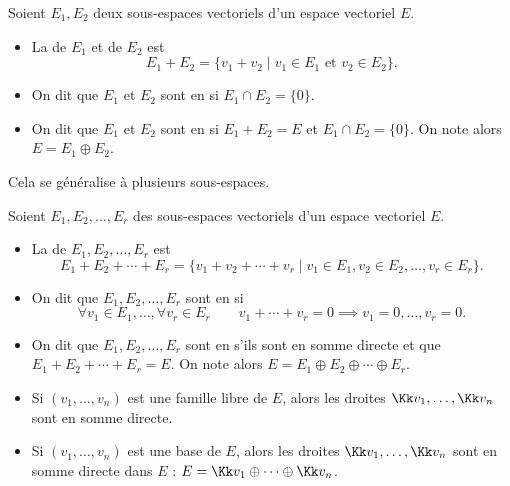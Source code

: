 \documentclass[12pt, class=report,crop=false]{standalone}
\begin{document}
\begin{definition}
Soient $E_1,E_2$ deux sous-espaces vectoriels d'un espace vectoriel $E$.
\begin{itemize}
  \item La  de $E_1$ et de $E_2$ est
  $$E_1+E_2 = \big\{  v_1 + v_2 \mid v_1 \in E_1 \text{ et } v_2 \in E_2 \big\}.$$
  
 
  \item On dit que $E_1$ et $E_2$ sont en  si $E_1 \cap E_2 = \{0\}$.
   

  \item On dit que $E_1$ et $E_2$ sont en  si 
  $E_1 + E_2 = E$ et $E_1 \cap E_2 = \{0\}$. On note alors
  $E = E_1 \oplus E_2$.
  
\end{itemize}
\end{definition}

Cela se généralise à plusieurs sous-espaces.
\begin{definition}
Soient $E_1,E_2, \ldots,E_r$ des sous-espaces vectoriels d'un espace vectoriel $E$.
\begin{itemize}
  \item La  de $E_1,E_2, \ldots,E_r$ est
  $$E_1+E_2+\cdots + E_r = \big\{  v_1 + v_2 + \cdots + v_r \mid v_1 \in E_1, v_2 \in E_2,\ldots,v_r \in E_r \big\}.$$  
 
 
  \item On dit que $E_1,E_2,\ldots,E_r$ sont en  si 
  \[\forall v_1 \in E_1,\ldots,\forall v_r \in E_r \qquad v_1+ \cdots +v_r = 0 \implies v_1=0,\ldots, v_r = 0.\]

  \item On dit que $E_1,E_2,\ldots,E_r$ sont en  s'ils sont en somme directe et que $E_1+E_2+\cdots+E_r=E$.  
  On note alors $E = E_1 \oplus E_2 \oplus \cdots \oplus E_r $.
\end{itemize}
\end{definition}

\begin{exemple}
\sauteligne
\begin{itemize}
  \item Si $(v_1,\ldots,v_n)$ est une famille libre de $E$, alors les droites $\Kk v_1,\ldots,\Kk v_n$ sont en somme directe. 

  \item Si $(v_1,\ldots,v_n)$ est une base de $E$, alors les droites $\Kk v_1,\ldots,\Kk v_n$ sont en somme directe dans $E$ :  $E = \Kk v_1 \oplus \cdots \oplus \Kk v_n$.
\end{itemize}
\end{exemple}
\end{document}

